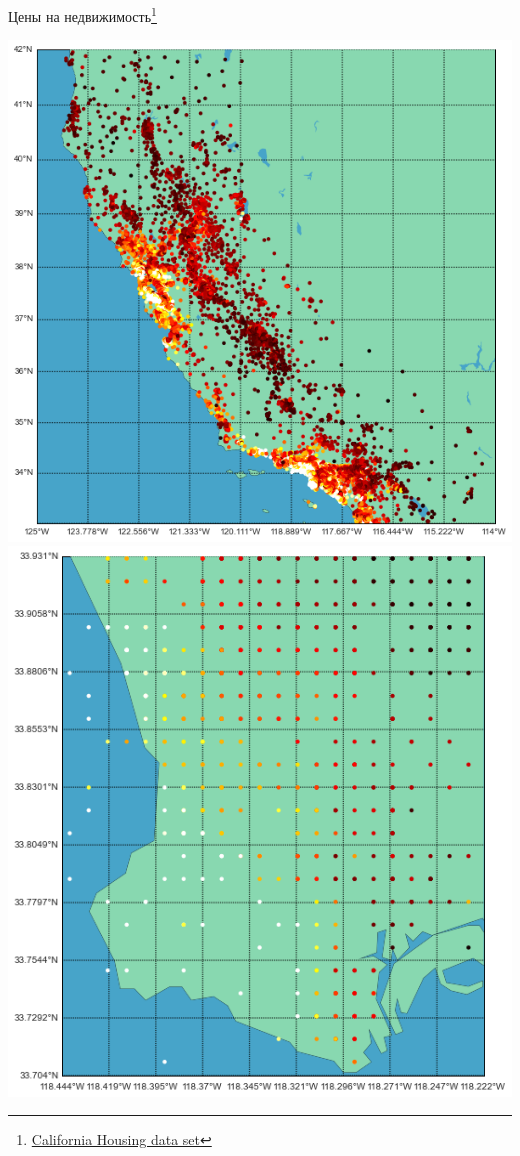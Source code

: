 \documentclass[aspectratio=169]{beamer}
\begin{document}
\begin{frame}{Цены на недвижимость\footnote{\href{http://www.dcc.fc.up.pt/~ltorgo/Regression/cal_housing.html}{California Housing data set}}}

\begin{center}
\includegraphics[height=0.6\textheight]{images/large.png} \qquad
\includegraphics[height=0.6\textheight]{images/map_small.png}
\end{center}

\end{frame}
\end{document}
